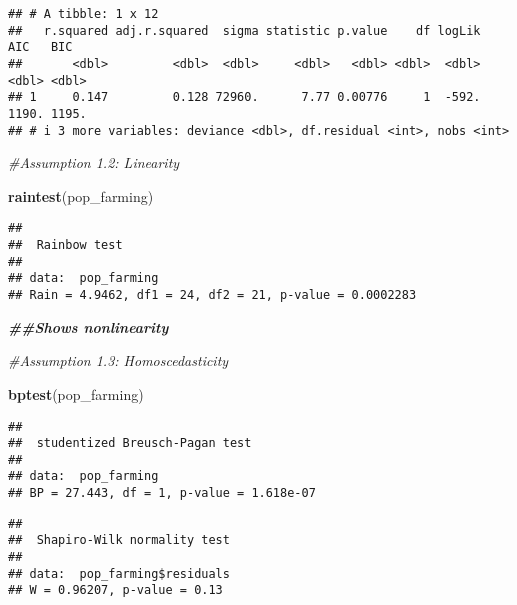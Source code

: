 \documentclass[
]{article}
\newenvironment{Shaded}{\begin{snugshade}}{\end{snugshade}}
\newcommand{\CommentTok}[1]{\textcolor[rgb]{0.56,0.35,0.01}{\textit{#1}}}
\newcommand{\DocumentationTok}[1]{\textcolor[rgb]{0.56,0.35,0.01}{\textbf{\textit{#1}}}}
\newcommand{\FunctionTok}[1]{\textcolor[rgb]{0.13,0.29,0.53}{\textbf{#1}}}
\newcommand{\NormalTok}[1]{#1}
\newcommand{\SpecialCharTok}[1]{\textcolor[rgb]{0.81,0.36,0.00}{\textbf{#1}}}
\begin{document}
\begin{verbatim}
## # A tibble: 1 x 12
##   r.squared adj.r.squared  sigma statistic p.value    df logLik   AIC   BIC
##       <dbl>         <dbl>  <dbl>     <dbl>   <dbl> <dbl>  <dbl> <dbl> <dbl>
## 1     0.147         0.128 72960.      7.77 0.00776     1  -592. 1190. 1195.
## # i 3 more variables: deviance <dbl>, df.residual <int>, nobs <int>
\end{verbatim}

\begin{Shaded}
\begin{Highlighting}[]
\CommentTok{\#Assumption 1.2: Linearity}

\FunctionTok{raintest}\NormalTok{(pop\_farming)}
\end{Highlighting}
\end{Shaded}

\begin{verbatim}
## 
##  Rainbow test
## 
## data:  pop_farming
## Rain = 4.9462, df1 = 24, df2 = 21, p-value = 0.0002283
\end{verbatim}

\begin{Shaded}
\begin{Highlighting}[]
\DocumentationTok{\#\#Shows nonlinearity}

\CommentTok{\#Assumption 1.3: Homoscedasticity}

\FunctionTok{bptest}\NormalTok{(pop\_farming)}
\end{Highlighting}
\end{Shaded}

\begin{verbatim}
## 
##  studentized Breusch-Pagan test
## 
## data:  pop_farming
## BP = 27.443, df = 1, p-value = 1.618e-07
\end{verbatim}

\begin{Shaded}
\end{Shaded}

\begin{verbatim}
## 
##  Shapiro-Wilk normality test
## 
## data:  pop_farming$residuals
## W = 0.96207, p-value = 0.13
\end{verbatim}
\end{document}
